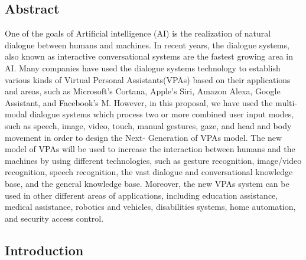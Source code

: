 \documentclass[12pt,a4paper]{article}
\begin{document}
\newpage
\cleardoublepage
\thispagestyle{empty}

\begin{center}
\section{Abstract}
\end{center}

\noindent
One of the goals of Artificial intelligence (AI) is the
realization of natural dialogue between humans and machines. In recent years, the dialogue systems, also known as interactive conversational systems are the fastest growing area in AI. Many companies have used the dialogue systems technology to establish various kinds of Virtual Personal Assistants(VPAs) based on their applications and areas, such as Microsoft’s Cortana, Apple’s Siri, Amazon Alexa, Google Assistant, and Facebook’s M. However, in this proposal, we have used the multi-modal dialogue systems which process two or more combined user input modes, such as speech, image, video, touch, manual gestures, gaze, and head and body movement in order to design the Next-
Generation of VPAs model. The new model of VPAs will be used
to increase the interaction between humans and the machines by
using different technologies, such as gesture recognition,
image/video recognition, speech recognition, the vast dialogue
and conversational knowledge base, and the general knowledge
base. Moreover, the new VPAs system can be used in other
different areas of applications, including education assistance,
medical assistance, robotics and vehicles, disabilities systems,
home automation, and security access control.
\newpage
\tableofcontents
\newpage
\begin{center}
\section{Introduction}
\end{center}
\end{document}
